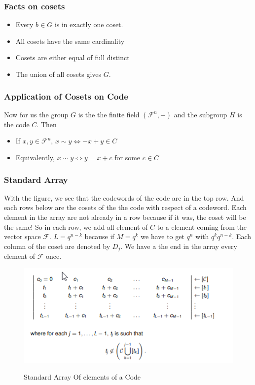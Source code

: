 \documentclass{article}
\begin{document}
\subsubsection{Facts on cosets}
\begin{itemize}
\item Every $ b \in G $ is in exactly one coset.
\item All cosets have the same cardinality
\item Cosets are either equal of full distinct
\item The union of all cosets gives $ G $.
\end{itemize}

\subsubsection{Application of Cosets on Code}  
Now for us the group $ G $ is the the finite field $ (\mathcal{F}^n,+) $ and the subgroup $ H $ is the code $ C $. Then
\begin{itemize}
\item If $ x,y \in \mathcal{F}^n $, $ x \sim y \Leftrightarrow -x + y \in C $
\item Equivalently, $ x \sim y \Leftrightarrow y = x + c $ for some $ c \in C $
\end{itemize}

\subsubsection{Standard Array}
With the figure, we see that the codewords of the code are in the top row. And each rows below are the cosets of the the code with respect of a codeword. Each element in the array are not already in a row because if it was, the coset will be the same! So in each row, we add all element of $ C $ to a element coming from the vector space $ \mathcal{F} $. $ L = q^{n-k} $ because if $ M = q^k $ we have to get $ q^n $ with $ q^{k}q^{n-k} $. Each column of the coset are denoted by $ D_j $. We have a the end in the array every element of $ \mathcal{F} $ once.

\begin{figure}[h]
  \includegraphics[width=\linewidth]{standardarray.png}
  \label{fig:standardarray}
  
  \caption{Standard Array Of elements of a Code}
\end{figure}
\end{document}
